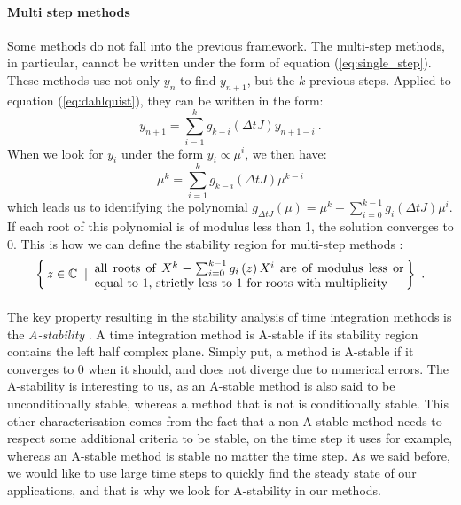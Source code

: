         \paragraph{Multi step methods}
        Some methods do not fall into the previous framework.
        The multi-step methods, in particular, cannot be written under the form of equation (\ref{eq:single_step}).
        These methods use not only $y_n$ to find $y_{n+1}$, but the $k$ previous steps.
        Applied to equation (\ref{eq:dahlquist}), they can be written in the form:
        \begin{equation}
          y_{n+1} = \sum_{i=1}^k g_{k-i}\left(\Delta t J\right) y_{n+1-i} \ .
        \end{equation}
        When we look for $y_i$ under the form $y_i \propto \mu^{i}$, we then have:
        \begin{equation}
          \mu^k = \sum_{i=1}^k g_{k-i}\left(\Delta t J\right) \mu^{k-i}
        \end{equation}
        which leads us to identifying the polynomial $g_{\Delta t J}\left(\mu\right) = \mu^k - \sum_{i=0}^{k-1}g_i\left(\Delta t J\right)\mu^i$.
        If each root of this polynomial is of modulus less than 1, the solution converges to 0.
        This is how we can define the stability region for multi-step methods \cite{HairerWanner1996}:
        \begin{equation}
          \left\{ \, z \in \mathbb{C} \; \mid \; \parbox{25em}{all roots of $X^k - \sum_{i=0}^{k-1}g_i\left(z\right)X^i$ are of modulus less or equal to 1, strictly less to 1 for roots with multiplicity}
           \, \right \} \ .
        \end{equation}

        \paragraph{}
        The key property resulting in the stability analysis of time integration methods is the \emph{A-stability} \cite{Dahlquist1963}.
        A time integration method is A-stable if its stability region contains the left half complex plane.
        Simply put, a method is A-stable if it converges to 0 when it should, and does not diverge due to numerical errors.
        The A-stability is interesting to us, as an A-stable method is also said to be unconditionally stable, whereas a method that is not is conditionally stable.
        This other characterisation comes from the fact that a non-A-stable method needs to respect some additional criteria to be stable, on the time step it uses for example, whereas an A-stable method is stable no matter the time step.
        As we said before, we would like to use large time steps to quickly find the steady state of our applications, and that is why  we look for A-stability in our methods.


